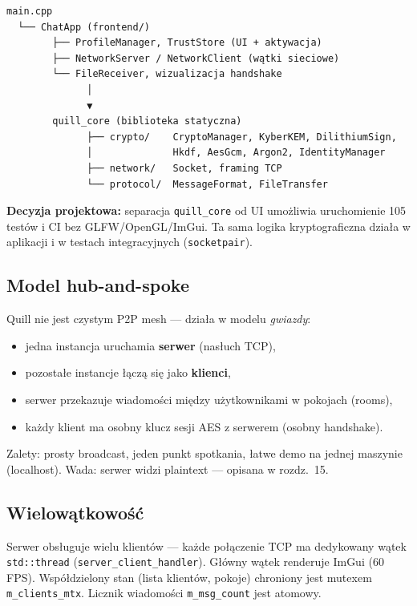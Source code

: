 \documentclass[12pt,a4paper]{article}
\begin{document}
\begin{lstlisting}[style=code,caption={Hierarchia modułów.}]
main.cpp
  └── ChatApp (frontend/)
        ├── ProfileManager, TrustStore (UI + aktywacja)
        ├── NetworkServer / NetworkClient (wątki sieciowe)
        └── FileReceiver, wizualizacja handshake
              │
              ▼
        quill_core (biblioteka statyczna)
              ├── crypto/    CryptoManager, KyberKEM, DilithiumSign,
              │              Hkdf, AesGcm, Argon2, IdentityManager
              ├── network/   Socket, framing TCP
              └── protocol/  MessageFormat, FileTransfer
\end{lstlisting}

\textbf{Decyzja projektowa:} separacja \texttt{quill\_core} od UI umożliwia uruchomienie 105 testów i CI bez GLFW/OpenGL/ImGui. Ta sama logika kryptograficzna działa w aplikacji i w testach integracyjnych (\texttt{socketpair}).

\subsection{Model hub-and-spoke}

Quill nie jest czystym P2P mesh --- działa w modelu \emph{gwiazdy}:
\begin{itemize}
    \item jedna instancja uruchamia \textbf{serwer} (nasłuch TCP),
    \item pozostałe instancje łączą się jako \textbf{klienci},
    \item serwer przekazuje wiadomości między użytkownikami w pokojach (rooms),
    \item każdy klient ma osobny klucz sesji AES z serwerem (osobny handshake).
\end{itemize}

Zalety: prosty broadcast, jeden punkt spotkania, łatwe demo na jednej maszynie (localhost). Wada: serwer widzi plaintext --- opisana w rozdz.~15.

\subsection{Wielowątkowość}

Serwer obsługuje wielu klientów --- każde połączenie TCP ma dedykowany wątek \texttt{std::thread} (\texttt{server\_client\_handler}). Główny wątek renderuje ImGui (60 FPS). Współdzielony stan (lista klientów, pokoje) chroniony jest mutexem \texttt{m\_clients\_mtx}. Licznik wiadomości \texttt{m\_msg\_count} jest atomowy.
\end{document}
